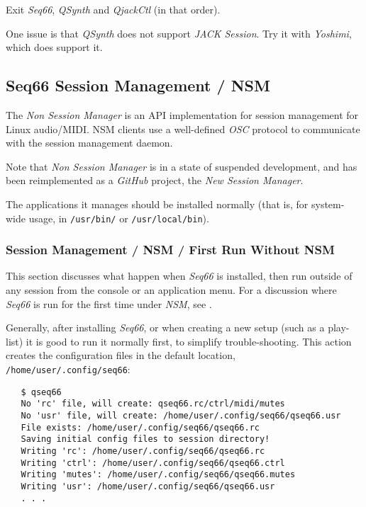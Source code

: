    Exit \textsl{Seq66}, \textsl{QSynth} and \textsl{QjackCtl}
   (in that order).

   One issue is that \textsl{QSynth}
   does not support \textsl{JACK Session}.
   Try it with \textsl{Yoshimi}, which does support it.


\subsection{Seq66 Session Management / NSM}
\label{subsec:sessions_nsm}

   The \textsl{Non Session Manager} is an API implementation for session
   management for Linux audio/MIDI. NSM clients use a well-defined
   \textsl{OSC} protocol to communicate with the session management daemon.

   Note that \textsl{Non Session Manager} is in a state of suspended
   development, and has been reimplemented as a \textsl{GitHub} project,
   the \textsl{New Session Manager}.

   The applications it manages should be installed normally (that is,
   for system-wide usage, in
   \texttt{/usr/bin/} or \texttt{/usr/local/bin}).

\subsubsection{Session Management / NSM / First Run Without NSM}
\label{subsec:sessions_nsm_first_run_without_nsm}

   This section discusses what happen when \textsl{Seq66} is installed, then
   run outside of any session from the console or an application menu.
   For a discussion where \textsl{Seq66} is run for the first time under
   \textsl{NSM},
   see .

   Generally, after installing \textsl{Seq66}, or when creating a new setup
   (such as a play-list) it is good to run it normally first, to simplify
   trouble-shooting.
   This action creates the configuration files in the default location,
   \texttt{/home/user/.config/seq66}:

\begin{verbatim}
   $ qseq66 
   No 'rc' file, will create: qseq66.rc/ctrl/midi/mutes
   No 'usr' file, will create: /home/user/.config/seq66/qseq66.usr
   File exists: /home/user/.config/seq66/qseq66.rc
   Saving initial config files to session directory!
   Writing 'rc': /home/user/.config/seq66/qseq66.rc
   Writing 'ctrl': /home/user/.config/seq66/qseq66.ctrl
   Writing 'mutes': /home/user/.config/seq66/qseq66.mutes
   Writing 'usr': /home/user/.config/seq66/qseq66.usr
   . . .
\end{verbatim}

